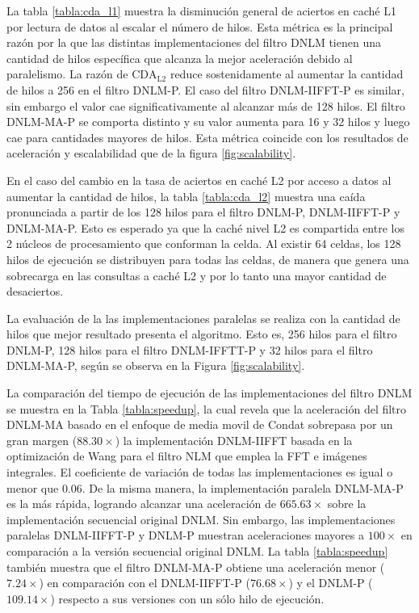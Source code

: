 La tabla \ref{tabla:cda_l1} muestra la disminuci\'on general de aciertos en cach\'e L1 por lectura de datos al escalar el n\'umero de hilos. Esta m\'etrica es la principal raz\'on por la que las distintas implementaciones del filtro DNLM tienen una cantidad de hilos espec\'ifica que alcanza la mejor aceleraci\'on debido al paralelismo. La raz\'on de $\text{CDA}_\text{L2}$ reduce sostenidamente al aumentar la cantidad de hilos a 256 en el filtro DNLM-P. El caso del filtro DNLM-IIFFT-P es similar, sin embargo el valor cae significativamente al alcanzar m\'	as de 128 hilos. El filtro DNLM-MA-P se comporta distinto y su valor aumenta para 16 y 32 hilos y luego cae para cantidades mayores de hilos. Esta m\'etrica coincide con los resultados de aceleraci\'on y escalabilidad que de la figura \ref{fig:scalability}.

En el caso del cambio en la tasa de aciertos en cach\'e L2 por acceso a datos al aumentar la cantidad de hilos, la tabla \ref{tabla:cda_l2} muestra una ca\'ida pronunciada a partir de los 128 hilos para el filtro DNLM-P, DNLM-IIFFT-P y DNLM-MA-P. Esto es esperado ya que la cach\'e nivel L2 es compartida entre los 2 n\'ucleos de procesamiento que conforman la celda. Al existir 64 celdas, los 128 hilos de ejecuci\'on se distribuyen para todas las celdas, de manera que genera una sobrecarga en las consultas a cach\'e L2 y por lo tanto una mayor cantidad de desaciertos.  


La evaluaci\'on de la las implementaciones paralelas se realiza con la cantidad de hilos que mejor resultado presenta el algoritmo. Esto es, 256 hilos para el filtro DNLM-P, 128 hilos para el filtro DNLM-IFFTT-P y 32 hilos para el filtro DNLM-MA-P, según se observa en la Figura \ref{fig:scalability}. 


La comparación del tiempo de ejecución de las implementaciones del filtro DNLM se muestra en la Tabla \ref{tabla:speedup}, la cual revela que la aceleración del filtro DNLM-MA basado en el enfoque de media movil de Condat \cite{Condat2010} sobrepasa por un gran margen ($88.30\times$) la implementación DNLM-IIFFT \cite{CalderonRamirez2017} basada en la optimización de Wang para el filtro NLM \cite{wang2006fast} que emplea la FFT e imágenes integrales. El coeficiente de variación de todas las implementaciones es igual o menor que $0.06$. 
De la misma manera, la implementación paralela DNLM-MA-P es la más rápida, logrando alcanzar una aceleración de $665.63\times$ sobre la implementación secuencial original DNLM. Sin embargo, las implementaciones paralelas DNLM-IIFFT-P y DNLM-P muestran aceleraciones mayores a $100\times$ en comparación a la versión secuencial original DNLM.
La tabla \ref{tabla:speedup} también muestra que el filtro DNLM-MA-P obtiene una aceleración menor ($7.24\times$) en comparación con el DNLM-IIFFT-P ($76.68\times$) y el DNLM-P ($109.14\times$) respecto a sus versiones con un sólo hilo de ejecución.



